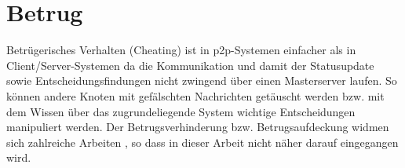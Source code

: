 



\section{Betrug}
Betrügerisches Verhalten (Cheating) ist in p2p-Systemen einfacher als in Client/Server-Systemen da die Kommunikation und damit der Statusupdate sowie Entscheidungsfindungen nicht zwingend über einen Masterserver laufen. So können andere Knoten mit gefälschten Nachrichten getäuscht werden bzw. mit dem Wissen über das zugrundeliegende System wichtige Entscheidungen manipuliert werden. Der Betrugsverhinderung bzw. Betrugsaufdeckung widmen sich zahlreiche Arbeiten \cite{citeulike:4243521, citeulike:499803, citeulike:3196934, citeulike:4243572, citeulike:6643788}, so dass in dieser Arbeit nicht näher darauf eingegangen wird.
